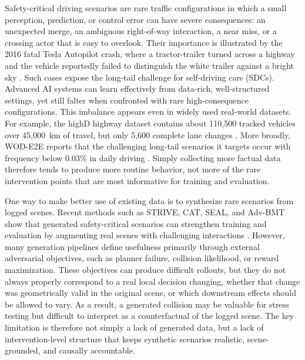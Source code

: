 \documentclass{article}
\newcommand{\zhou}[1]{{\textsf{\textcolor{red}{[Zhou: #1]}}}}
\begin{document}
Safety-critical driving scenarios are rare traffic configurations in which a small perception, prediction, or control error can have severe consequences: an unexpected merge, an ambiguous right-of-way interaction, a near miss, or a crossing actor that is easy to overlook. Their importance is illustrated by the 2016 fatal Tesla Autopilot crash, where a tractor-trailer turned across a highway and the vehicle reportedly failed to distinguish the white trailer against a bright sky \citep{guardian2016tesla}. Such cases expose the long-tail challenge for self-driving cars (SDCs). Advanced AI systems can learn effectively from data-rich, well-structured settings, yet still falter when confronted with rare high-consequence configurations. This imbalance appears even in widely used real-world datasets. For example, the highD highway dataset contains about 110{,}500 tracked vehicles over 45{,}000~km of travel, but only 5{,}600 complete lane changes \citep{krajewski2018highd}. More broadly, WOD-E2E reports that the challenging long-tail scenarios it targets occur with frequency below 0.03\% in daily driving \citep{xu2025wode2e}. Simply collecting more factual data therefore tends to produce more routine behavior, not more of the rare intervention points that are most informative for training and evaluation.

One way to make better use of existing data is to synthesize rare scenarios from logged scenes. Recent methods such as STRIVE, CAT, SEAL, and Adv-BMT show that generated safety-critical scenarios can strengthen training and evaluation by augmenting real scenes with challenging interactions \citep{rempe2022strive,zhang2023cat,stoler2025seal,liu2025advbmt}. However, many generation pipelines define usefulness primarily through external adversarial objectives, such as planner failure, collision likelihood, or reward maximization. These objectives can produce difficult rollouts, but they do not always properly correspond to a real local decision changing, whether that change was geometrically valid in the original scene, or which downstream effects should be allowed to vary. As a result, a generated collision may be valuable for stress testing but difficult to interpret as a counterfactual of the logged scene. The key limitation is therefore not simply a lack of generated data, but a lack of intervention-level structure that keeps synthetic scenarios realistic, scene-grounded, and causally accountable.
\end{document}
